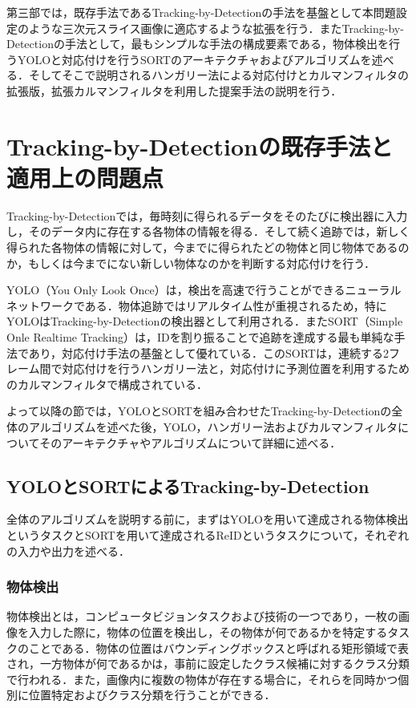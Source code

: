 \thispagestyle{fancy2}

第三部では，既存手法であるTracking-by-Detectionの手法を基盤として本問題設定のような三次元スライス画像に適応するような拡張を行う．またTracking-by-Detectionの手法として，最もシンプルな手法の構成要素である，物体検出を行うYOLOと対応付けを行うSORTのアーキテクチャおよびアルゴリズムを述べる．そしてそこで説明されるハンガリー法による対応付けとカルマンフィルタの拡張版，拡張カルマンフィルタを利用した提案手法の説明を行う．

\section{Tracking-by-Detectionの既存手法と適用上の問題点}
\label{sec:existing_method}

Tracking-by-Detectionでは，毎時刻に得られるデータをそのたびに検出器に入力し，そのデータ内に存在する各物体の情報を得る．そして続く追跡では，新しく得られた各物体の情報に対して，今までに得られたどの物体と同じ物体であるのか，もしくは今までにない新しい物体なのかを判断する対応付けを行う．

YOLO（You Only Look Once）\cite{redmon2016you, alif2024yolov1}は，検出を高速で行うことができるニューラルネットワークである．物体追跡ではリアルタイム性が重視されるため，特にYOLOはTracking-by-Detectionの検出器として利用される．またSORT（Simple Onle Realtime Tracking）\cite{bewley2016simple,wojke2017simple,du2023strongsort}は，IDを割り振ることで追跡を達成する最も単純な手法であり，対応付け手法の基盤として優れている．このSORTは，連続する2フレーム間で対応付けを行うハンガリー法\cite{kuhn1955hungarian}と，対応付けに予測位置を利用するためのカルマンフィルタ\cite{bishop2001introduction}で構成されている．

よって以降の節では，YOLOとSORTを組み合わせたTracking-by-Detectionの全体のアルゴリズムを述べた後，YOLO，ハンガリー法およびカルマンフィルタについてそのアーキテクチャやアルゴリズムについて詳細に述べる．

    \subsection{YOLOとSORTによるTracking-by-Detection}
    \label{subsec:yolo_and_sort}
    
    全体のアルゴリズムを説明する前に，まずはYOLOを用いて達成される物体検出というタスクとSORTを用いて達成されるReIDというタスクについて，それぞれの入力や出力を述べる．

        \subsubsection{物体検出}
        物体検出とは，コンピュータビジョンタスクおよび技術の一つであり，一枚の画像を入力した際に，物体の位置を検出し，その物体が何であるかを特定するタスクのことである．物体の位置はバウンディングボックスと呼ばれる矩形領域で表され，一方物体が何であるかは，事前に設定したクラス候補に対するクラス分類で行われる．また，画像内に複数の物体が存在する場合に，それらを同時かつ個別に位置特定およびクラス分類を行うことができる．

